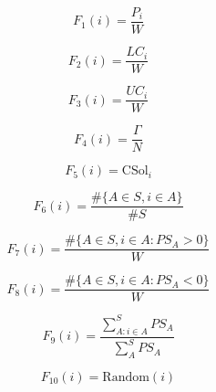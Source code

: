 \documentclass[spanish, a4paper, 12pt, twoside, openany,final]{book}
\numberwithin{equation}{section}
\begin{document}
\begin{multicols}{2}
	
	
	\begin{equation}
		F_1\left(i\right)   = \frac{P_i}{W}
		\label{feature:1}
	\end{equation}
	
	\begin{equation}
		F_2\left(i\right)   = \frac{LC_i}{W}
		\label{feature:2}
	\end{equation}
	
	\begin{equation}
		F_3\left(i\right)   = \frac{UC_i}{W}
		\label{feature:3}
	\end{equation}
	
	\begin{equation}
		F_4\left(i\right)   = \frac{\Gamma}{N}
		\label{feature:4}
	\end{equation}
	
	\begin{equation}
		F_5\left(i\right)   = \text{CSol}_i
		\label{feature:5}
	\end{equation}
	
	\begin{equation}
		F_6\left(i\right)   = \frac{\#\{A\in S,i \in A \}}{\#S}
		\label{feature:6}
	\end{equation}
	
	\begin{equation}
		F_7\left(i\right)   = \frac{\#\{A\in S,i \in A: PS_A > 0 \}}{W}
		\label{feature:7}
	\end{equation}
	
	\begin{equation}
		F_8\left(i\right)   = \frac{\#\{A\in S,i \in A: PS_A < 0 \}}{W}
		\label{feature:8}
	\end{equation}
	
	\begin{equation}
		F_9\left(i\right)   = \frac{\sum^S_{A: i\in A} PS_{A}}{\sum^S_{A} PS_A}
		\label{feature:9}
	\end{equation}
	
	\begin{equation}
		F_10\left(i\right)   = \text{Random}\left(i\right)
		\label{feature:10}
	\end{equation}
	
\end{multicols}

\clearpage
\end{document}
